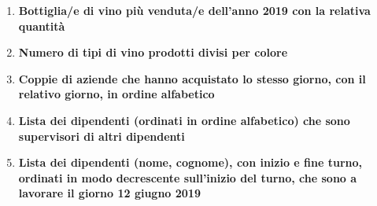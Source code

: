 \begin{enumerate}
	\item \textbf{Bottiglia/e di vino più venduta/e dell'anno 2019 con la relativa quantità}
	\item \textbf{Numero di tipi di vino prodotti divisi per colore}
	\item \textbf{Coppie di aziende che hanno acquistato lo stesso giorno, con il relativo giorno, in ordine alfabetico}
	\item \textbf{Lista dei dipendenti (ordinati in ordine alfabetico) che sono supervisori di altri dipendenti}
	\item \textbf{Lista dei dipendenti (nome, cognome), con inizio e fine turno, ordinati in modo decrescente sull'inizio del turno, che sono a lavorare il giorno 12 giugno 2019}
	
\end{enumerate}